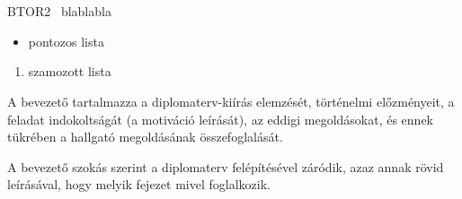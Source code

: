 \chapter{\bevezetes}

BTOR2~\cite{btor2} blablabla

\begin{itemize}
    \item pontozos lista
\end{itemize}

\begin{enumerate}
    \item szamozott lista
\end{enumerate}

A bevezető tartalmazza a diplomaterv-kiírás elemzését, történelmi előzményeit, a feladat indokoltságát (a motiváció leírását), az eddigi megoldásokat, és ennek tükrében a hallgató megoldásának összefoglalását.

A bevezető szokás szerint a diplomaterv felépítésével záródik, azaz annak rövid leírásával, hogy melyik fejezet mivel foglalkozik.
